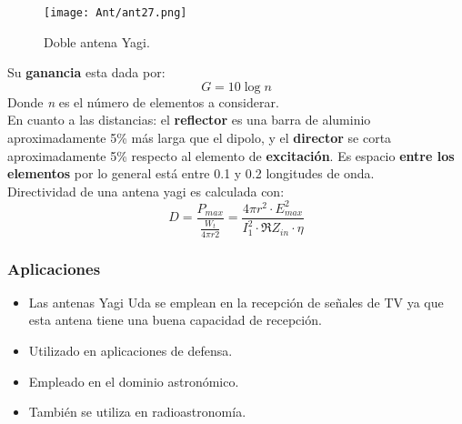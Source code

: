 \documentclass[
	12pt, %
	fleqn, %
	a4paper, %
	oneside, %
]{LegrandOrangeBook}
\begin{document}
\begin{figure}[H]
\centering
\texttt{[image: Ant/ant27.png]}
\caption{Doble antena Yagi.}
\end{figure}
Su \textbf{ganancia} esta dada por:
\begin{equation}
G=10\log n
\end{equation}
Donde \textit{n} es el número de elementos a considerar.\\
En cuanto a las distancias: el \textbf{reflector} es una barra de aluminio aproximadamente 5\% más larga que el dipolo, y el \textbf{director} se corta aproximadamente 5\% respecto al elemento de \textbf{excitación}. Es espacio \textbf{entre los elementos} por lo general está entre 0.1 y 0.2 longitudes de onda.\\
Directividad de una antena yagi es calculada con:
\begin{equation}
D=\frac{P_{max}}{\frac{W_t}{4\pi r2}}=\frac{4\pi r^2\cdot E_{max}^2}{I_1^2\cdot \Re{Z_{in}}\cdot\eta}
\end{equation}
\subsubsection{Aplicaciones}
\begin{itemize}
\item Las antenas Yagi Uda se emplean en la recepción de señales de TV ya que esta antena tiene una buena capacidad de recepción.
\item Utilizado en aplicaciones de defensa.
\item Empleado en el dominio astronómico.
\item También se utiliza en radioastronomía.
\end{itemize}
\end{document}
